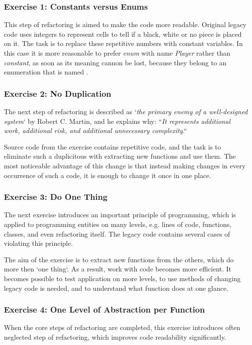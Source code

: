     \subsubsection{Exercise 1: Constants versus Enums}
    This step of refactoring is aimed to make the code more readable. Original legacy code uses integers to represent cells to tell if a black, white or no piece is placed on it. The task is to replace these repetitive numbers with constant variables. In this case it is more reasonable to prefer \textit{enum} with name \textit{Player} rather than \textit{constant}, as soon as its meaning cannon be lost, because they belong to an enumeration that is named \cite[Constants versus Enums]{clean_code}.
    
    \subsubsection{Exercise 2: No Duplication}
    The next step of refactoring is described as `\textit{the primary enemy of a well-designed system}` by Robert C. Martin, and he explains why: ``\textit{It represents additional work, additional risk, and additional unnecessary complexity}\cite[No Duplication]{clean_code}.``
    
    Source code from the exercise contains repetitive code, and the task is to eliminate such a duplicitous with extracting new functions and use them. The most noticeable advantage of this change is that instead making changes in every occurrence of such a code, it is enough to change it once in one place.
    
    \subsubsection{Exercise 3: Do One Thing}
    The next exercise introduces an important principle of programming, which is applied to programming entities on many levels, e.g. lines of code, functions, classes, and even refactoring itself. The legacy code contains several cases of violating this principle\cite[Do One Thing]{clean_code}.
    
    The aim of the exercise is to extract new functions from the others, which do more then `one thing`. As a result, work with code becomes more efficient. It becomes possible to test application on more levels, to use methods of changing legacy code is needed, and to understand what function does at one glance.
    
    \subsubsection{Exercise 4: One Level of Abstraction per Function}
    When the core steps of refactoring are completed, this exercise introduces often neglected step of refactoring, which improves code readability significantly.
    
